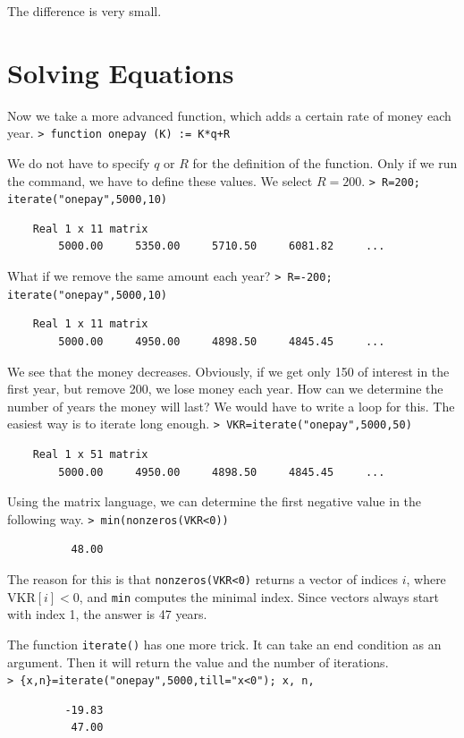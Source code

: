 \documentclass[11pt, a4paper]{article}
\newcommand{\emtcmd}[1]{\noindent\texttt{\textcolor{emtcommand}{>}\ #1}\par\smallskip}
\begin{document}
The difference is very small.

\section*{Solving Equations}

Now we take a more advanced function, which adds a certain rate of money each year.
\emtcmd{function onepay (K) := K*q+R}

We do not have to specify $q$ or $R$ for the definition of the function. Only if we run the command, we have to define these values. We select $R=200$.
\emtcmd{R=200; iterate("onepay",5000,10)}
\begin{verbatim}
    Real 1 x 11 matrix
        5000.00     5350.00     5710.50     6081.82     ...
\end{verbatim}

What if we remove the same amount each year?
\emtcmd{R=-200; iterate("onepay",5000,10)}
\begin{verbatim}
    Real 1 x 11 matrix
        5000.00     4950.00     4898.50     4845.45     ...
\end{verbatim}

We see that the money decreases. Obviously, if we get only 150 of interest in the first year, but remove 200, we lose money each year. How can we determine the number of years the money will last? We would have to write a loop for this. The easiest way is to iterate long enough.
\emtcmd{VKR=iterate("onepay",5000,50)}
\begin{verbatim}
    Real 1 x 51 matrix
        5000.00     4950.00     4898.50     4845.45     ...
\end{verbatim}

Using the matrix language, we can determine the first negative value in the following way.
\emtcmd{min(nonzeros(VKR<0))}
\begin{verbatim}
          48.00
\end{verbatim}

The reason for this is that \texttt{nonzeros(VKR<0)} returns a vector of indices $i$, where $\text{VKR}[i]<0$, and \texttt{min} computes the minimal index. Since vectors always start with index 1, the answer is 47 years.

The function \texttt{iterate()} has one more trick. It can take an end condition as an argument. Then it will return the value and the number of iterations.
\emtcmd{\{x,n\}=iterate("onepay",5000,till="x<0"); x, n,}
\begin{verbatim}
         -19.83
          47.00
\end{verbatim}
\end{document}
